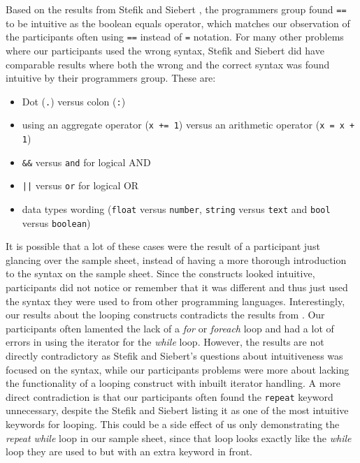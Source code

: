\documentclass[preprint,10pt]{sigplanconf}
\begin{document}
Based on the results from Stefik and Siebert \cite{Empiricalinvestigation}, the programmers group found \lstinline!==! to be intuitive as the boolean equals operator, which matches our observation of the participants often using \lstinline!==! instead of \lstinline!=! notation. For many other problems where our participants used the wrong syntax, Stefik and Siebert\cite{Empiricalinvestigation} did have comparable results where both the wrong and the correct syntax was found intuitive by their programmers group. These are: 
\begin{itemize}
\item Dot (\lstinline!.!) versus colon (\lstinline!:!)
\item using an aggregate operator (\lstinline!x += 1!) versus an arithmetic operator (\lstinline!x = x + 1!)
\item \lstinline!&&! versus \lstinline!and! for logical AND
\item \lstinline!||! versus \lstinline!or! for logical OR
\item data types wording (\lstinline!float! versus \lstinline!number!, \lstinline!string! versus \lstinline!text! and \lstinline!bool! versus \lstinline!boolean!)
\end{itemize}

It is possible that a lot of these cases were the result of a participant just glancing over the sample sheet, instead of having a more thorough introduction to the syntax on the sample sheet. Since the constructs looked intuitive, participants did not notice or remember that it was different and thus just used the syntax they were used to from other programming languages. Interestingly, our results about the looping constructs contradicts the results from \cite{Empiricalinvestigation}. Our participants often lamented the lack of a \textit{for} or \textit{foreach} loop and had a lot of errors in using the iterator for the \textit{while} loop. %
However, the results are not directly contradictory as Stefik and Siebert's questions about intuitiveness was focused on the syntax, while our participants problems were more about lacking the functionality of a looping construct with inbuilt iterator handling. A more direct contradiction is that our participants often found the \lstinline!repeat! keyword unnecessary, despite the Stefik and Siebert listing it as one of the most intuitive keywords for looping. This could be a side effect of us only demonstrating the \textit{repeat while} loop in our sample sheet, since that loop looks exactly like the \textit{while} loop they are used to but with an extra keyword in front. 
\end{document}
